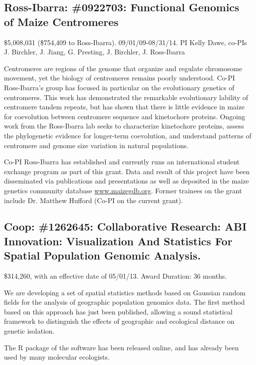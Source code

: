 \subsection*{Ross-Ibarra: \#0922703: Functional Genomics of Maize Centromeres}
\$5,008,031 (\$754,409 to Ross-Ibarra). 09/01/09-08/31/14. PI Kelly Dawe, co-PIs J. Birchler, J. Jiang, G. Presting, J. Birchler, J. Ross-Ibarra
\par{} Centromeres are regions of the genome that organize and regulate chromosome movement, yet the biology of centromeres remains poorly understood. Co-PI Ross-Ibarra's group has focused in particular on the evolutionary genetics of centromeres. This work has demonstrated the remarkable evolutionary lability of centromere tandem repeats, but has shown that there is little evidence in maize for coevolution between centromere sequence and kinetochore proteins. Ongoing work from the Ross-Ibarra lab seeks to characterize kinetochore proteins, assess the phylogenetic evidence for longer-term coevolution, and understand patterns of centromere and genome size variation in natural populations.
\par{}  Co-PI Ross-Ibarra has established and currently runs an international student exchange program as part of this grant. Data and result of this project have been disseminated via publications and presentations as well as deposited in the maize genetics community database \url{www.maizegdb.org}. Former trainees on the grant include Dr. Matthew Hufford (Co-PI on the current grant). 
\par{} \citet{Shi2010a, Chia2012a, Fang2012a, Hufford2012, Hufford2012b, Hufford2013, Melters2013a, Kanizay2013, Pyhajarvi2013}

\subsection*{Coop: \#1262645: Collaborative Research: ABI Innovation: Visualization And Statistics For Spatial Population Genomic Analysis. }
\$314,260, with an effective date of 05/01/13. Award Duration: 36 months.
\par{} We are developing a set of spatial statistics methods based on Gaussian random fields for the analysis of geographic population genomics data. The first method based on this approach has just been published, allowing a sound statistical framework to distinguish the effects of geographic and ecological distance on genetic isolation. 
\par{}  The R package of the software has been released online, and has already been used by many molecular ecologists. 
\par{} \citet{bradburd2013}

